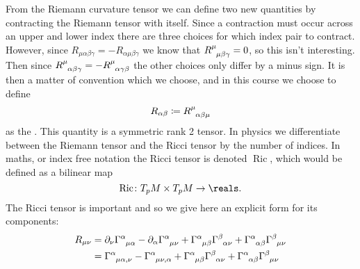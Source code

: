 \documentclass[fleqn]{NotesClass}
\newcommand*{\christoffel}[3]{\tensor{\Gamma}{^{#1}_{{#2}{#3}}}}
\begin{document}
    From the Riemann curvature tensor we can define two new quantities by contracting the Riemann tensor with itself.
    Since a contraction must occur across an upper and lower index there are three choices for which index pair to contract.
    However, since \(R_{\mu\alpha\beta\gamma} = -R_{\alpha\mu\beta\gamma}\) we know that \(\tensor{R}{^\mu_{\mu\beta\gamma}} = 0\), so this isn't interesting.
    Then since \(\tensor{R}{^\mu_{\alpha\beta\gamma}} = -\tensor{R}{^\mu_{\alpha\gamma\beta}}\) the other choices only differ by a minus sign.
    It is then a matter of convention which we choose, and in this course we choose to define
    \begin{equation}
        R_{\alpha\beta} \coloneqq \tensor{R}{^\mu_{\alpha\beta\mu}}
    \end{equation}
    as the .
    This quantity is a symmetric rank 2 tensor.
    In physics we differentiate between the Riemann tensor and the Ricci tensor by the number of indices.
    In maths, or index free notation the Ricci tensor is denoted \(\mathop{\mathrm{Ric}}\), which would be defined as a bilinear map
    \begin{equation}
        \mathop{\mathrm{Ric}}\colon T_p M \times T_p M \to \reals.
    \end{equation}
    The Ricci tensor is important and so we give here an explicit form for its components:
    \begin{align}
        R_{\mu\nu} &= \partial_\nu \christoffel{\alpha}{\mu}{\alpha} - \partial_\alpha \christoffel{\alpha}{\mu}{\nu} + \christoffel{\alpha}{\mu}{\beta}\christoffel{\beta}{\alpha}{\nu} + \christoffel{\alpha}{\alpha}{\beta}\christoffel{\beta}{\mu}{\nu}\\
        &= \christoffel{\alpha}{\mu}{\alpha,\nu} - \christoffel{\alpha}{\mu}{\nu,\alpha} + \christoffel{\alpha}{\mu}{\beta}\christoffel{\beta}{\alpha}{\nu} + \christoffel{\alpha}{\alpha}{\beta}\christoffel{\beta}{\mu}{\nu}
    \end{align}
    
\end{document}
